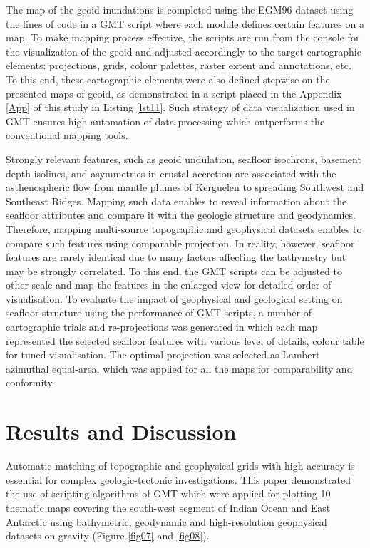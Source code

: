 \documentclass[geomatics,article,submit,pdftex,moreauthors]{Definitions/mdpi}
\begin{document}
The map of the geoid inundations is completed using the EGM96 dataset using the lines of code in a GMT script where each module defines certain features on a map. To make mapping process effective, the scripts are run from the console for the visualization of the geoid and adjusted accordingly to the target cartographic elements: projections, grids, colour palettes, raster extent and annotations, etc. To this end, these cartographic elements were also defined stepwise on the presented maps of geoid, as demonstrated in a script placed in the Appendix \ref{App} of this study in Listing \ref{lst11}. Such strategy of data visualization used in GMT ensures high automation of data processing which outperforms the conventional mapping tools.

Strongly relevant features, such as geoid undulation, seafloor isochrons, basement depth isolines, and asymmetries in crustal accretion are associated with the asthenospheric flow from mantle plumes of Kerguelen to spreading Southwest and Southeast Ridges. Mapping such data enables to reveal information about the seafloor attributes and compare it with the geologic structure and geodynamics. Therefore, mapping multi-source topographic and geophysical datasets enables to compare such features using comparable projection. In reality, however, seafloor features are rarely identical due to many factors affecting the bathymetry but may be strongly correlated. To this end, the GMT scripts can be adjusted to other scale and map the features in the enlarged view for detailed order of visualisation. To evaluate the impact of geophysical and geological setting on seafloor structure using the performance of GMT scripts, a number of cartographic trials and re-projections was generated in which each map represented the selected seafloor features with various level of details, colour table for tuned visualisation. The optimal projection was selected as Lambert azimuthal equal-area, which was applied for all the maps for comparability and conformity.

\section{Results and Discussion}

Automatic matching of topographic and geophysical grids with high accuracy is essential for complex geologic-tectonic investigations. This paper demonstrated the use of scripting algorithms of GMT which were applied for plotting 10 thematic maps covering the south-west segment of Indian Ocean and East Antarctic using bathymetric, geodynamic and high-resolution geophysical datasets on gravity (Figure \ref{fig07} and \ref{fig08}). 
\end{document}
